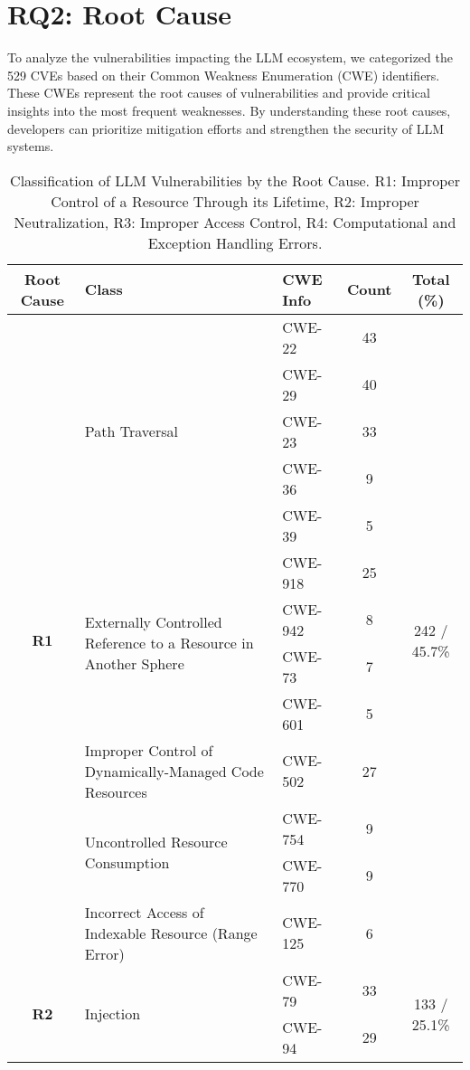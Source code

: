 \section{RQ2: Root Cause}
To analyze the vulnerabilities impacting the LLM ecosystem, we categorized the 529 CVEs based on their Common Weakness Enumeration (CWE) identifiers. These CWEs represent the root causes of vulnerabilities and provide critical insights into the most frequent weaknesses. By understanding these root causes, developers can prioritize mitigation efforts and strengthen the security of LLM systems.

\begin{table*}[t]
\centering
\caption{Classification of LLM Vulnerabilities by the Root Cause. R1: Improper Control of a Resource Through its Lifetime, R2: Improper Neutralization, R3: Improper Access Control, R4: Computational and Exception Handling Errors.}
\fontsize{9.5}{13}\selectfont
\label{tab:cwe_distribution}
\begin{tabular}{c|llc|c}
\hline
\textbf{Root Cause} & \textbf{Class} & \textbf{CWE Info} & \textbf{Count} & \textbf{Total (\%)} \\
\hline
\multirow{13}{*}{\textbf{R1}} 
& \multirow{5}{*}{Path Traversal} & CWE-22 & 43 & \multirow{13}{*}{242 / 45.7\%} \\
&  & CWE-29 & 40 & \\
&  & CWE-23 & 33 & \\
&  & CWE-36 & 9 & \\
&  & CWE-39 & 5 & \\
\cline{2-4}
& \multirow{4}{*}{Externally Controlled Reference to a Resource in Another Sphere} 
& CWE-918 & 25 & \\
&  & CWE-942 & 8 & \\
&  & CWE-73 & 7 & \\
&  & CWE-601 & 5 & \\
\cline{2-4}
& Improper Control of Dynamically-Managed Code Resources & CWE-502 & 27 & \\
\cline{2-4}
& \multirow{2}{*}{Uncontrolled Resource Consumption} 
& CWE-754 & 9 & \\
&  & CWE-770 & 9 & \\
\cline{2-4}
& \multirow{1}{*}{Incorrect Access of Indexable Resource (Range Error)} 
& CWE-125 & 6 & \\
\hline
\multirow{6}{*}{\textbf{R2}} 
& \multirow{6}{*}{Injection} 
& CWE-79 & 33 & \multirow{6}{*}{133 / 25.1\%} \\
&  & CWE-94 & 29 & \\

\end{tabular}
\end{table*}
